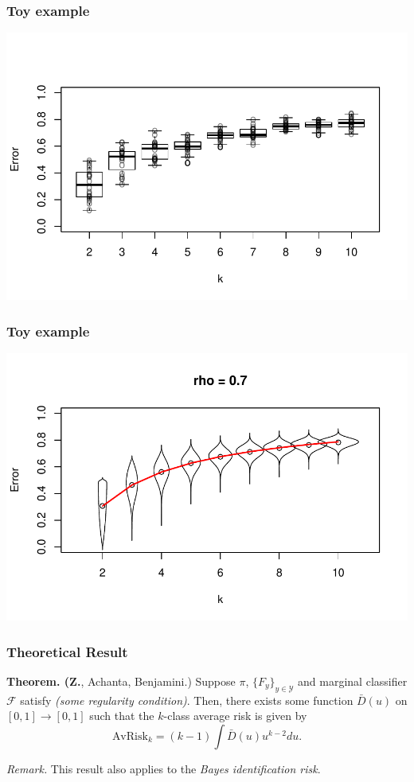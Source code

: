 \documentclass{beamer}
\begin{document}
\begin{frame}
\frametitle{Toy example}
\begin{center}
\includegraphics[scale = 0.5]{../extrapolation/autoplots/all_box.pdf}
\end{center}
\end{frame}

\begin{frame}
\frametitle{Toy example}
\begin{center}
\includegraphics[scale = 0.5]{../extrapolation/illus_err_0_7.pdf}
\end{center}
\end{frame}


\begin{frame}
\frametitle{Theoretical Result}

\textbf{Theorem. (Z.}, Achanta, Benjamini.)
Suppose $\pi$, $\{F_y\}_{y \in \mathcal{Y}}$ and marginal classifier
$\mathcal{F}$ satisfy \emph{(some regularity condition)}.  Then, 
there exists some function $\bar{D}(u)$ on $[0,1] \to [0,1]$ such that
the $k$-class average risk is given by
\[
\text{AvRisk}_k = (k-1) \int \bar{D}(u) u^{k-2} du.
\]
\pause
\vspace{1in}

\emph{Remark.} This result also applies to the \emph{Bayes identification risk}.

\end{frame}
\end{document}

